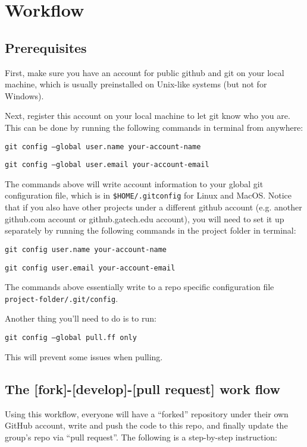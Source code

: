 \documentclass{article}
\begin{document}
\section{Workflow}

\subsection{Prerequisites}

First, make sure you have an account for public github and git on your local machine,
which is usually preinstalled on Unix-like systems (but not for Windows).

Next, register this account on your local machine to let git know who you are.
This can be done by running the following commands in terminal from anywhere:

\texttt{git config --global user.name your-account-name}

\texttt{git config --global user.email your-account-email}

The commands above will write account information to your global git configuration file, which is in \texttt{\$HOME/.gitconfig}
for Linux and MacOS.
Notice that if you also have other projects under a different github account (e.g. another github.com account
or github.gatech.edu account), you will need to set it up separately by running the following
commands in the project folder in terminal:

\texttt{git config user.name your-account-name}

\texttt{git config user.email your-account-email}

The commands above essentially write to a repo specific configuration file \texttt{project-folder/.git/config}.

Another thing you'll need to do is to run:

\texttt{git config --global pull.ff only}

This will prevent some issues when pulling.

\subsection{The [fork]-[develop]-[pull request] work flow}

Using this workflow, everyone will have a ``forked'' repository under their own GitHub account,
write and push the code to this repo, and finally update the group's repo via ``pull request''.
The following is a step-by-step instruction:
\end{document}
